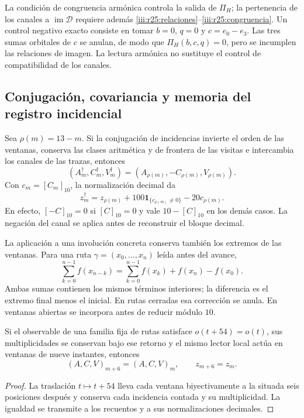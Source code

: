 La condición de congruencia armónica controla la salida de $\Pi_H$;
la pertenencia de los canales a $\operatorname{im}\mathcal D$
requiere además \eqref{iii:r25:relaciones}--\eqref{iii:r25:congruencia}.
Un control negativo exacto consiste en tomar $b=0$, $q=0$ y
$c=e_0-e_3$. Las tres sumas orbitales de $c$ se anulan, de modo
que $\Pi_H(b,c,q)=0$, pero se incumplen las relaciones de imagen.
La lectura armónica no sustituye el control de compatibilidad de
los canales.

\subsection{Conjugación, covariancia y memoria del registro incidencial}
\label{iii:r25:transporte}

Sea $\rho(m)=13-m$. Si la conjugación de incidencias invierte el
orden de las ventanas, conserva las clases aritmética y de frontera
de las visitas e intercambia los canales de las trazas, entonces
\[
 (A_m^\dagger,C_m^\dagger,V_m^\dagger)
 =(A_{\rho(m)},-C_{\rho(m)},V_{\rho(m)}).
\]
Con $c_m=[C_m]_{10}$, la normalización decimal da
\begin{equation}
 z_m^\dagger=z_{\rho(m)}
 +100\mathbf1_{\{c_{\rho(m)}\ne0\}}-20c_{\rho(m)}.
 \label{iii:r25:conjugacion}
\end{equation}
En efecto, $[-C]_{10}=0$ si $[C]_{10}=0$ y vale
$10-[C]_{10}$ en los demás casos. La negación del canal se
aplica antes de reconstruir el bloque decimal.

La aplicación a una involución concreta conserva también los
extremos de las ventanas. Para una ruta
$\gamma=(x_0,\ldots,x_n)$ leída antes del avance,
\begin{equation}
 \sum_{k=0}^{n-1}f(x_{n-k})
 =\sum_{k=0}^{n-1}f(x_k)+f(x_n)-f(x_0).
 \label{iii:r25:extremos}
\end{equation}
Ambas sumas contienen los mismos términos interiores; la diferencia
es el extremo final menos el inicial. En rutas cerradas esa
corrección se anula. En ventanas abiertas se incorpora antes de
reducir módulo $10$.

\begin{proposition}
\label{iii:r25:periodo}
Si el observable de una familia fija de rutas satisface
$o(t+54)=o(t)$, sus multiplicidades se conservan bajo ese retorno
y el mismo lector local actúa en ventanas de nueve instantes,
entonces
\[
 (A,C,V)_{m+6}=(A,C,V)_m,\qquad z_{m+6}=z_m.
\]
\end{proposition}
\begin{proof}
La traslación $t\mapsto t+54$ lleva cada ventana biyectivamente
a la situada seis posiciones después y conserva cada incidencia
contada y su multiplicidad. La igualdad se transmite a los recuentos
y a sus normalizaciones decimales.
\end{proof}

